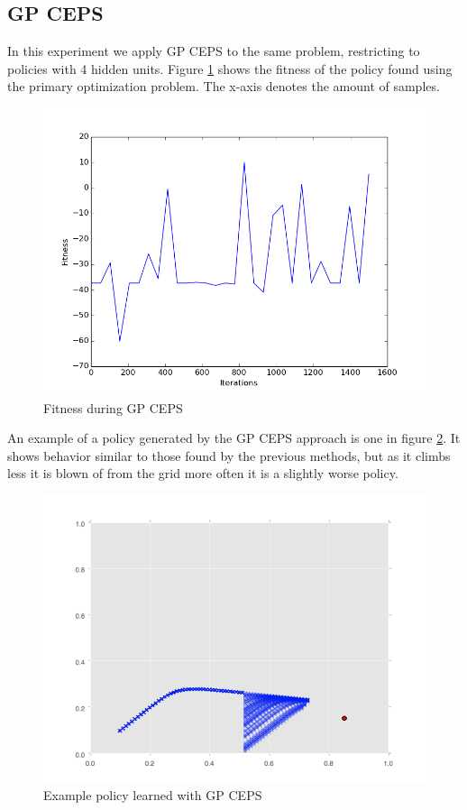 \subsection{GP CEPS}

In this experiment we apply GP CEPS to the same problem, restricting to policies with 4 hidden units. Figure \ref{Fitness during GP CEPS} shows the fitness of the policy found using the primary optimization problem. The x-axis denotes the amount of samples. 

\begin{figure}[ht]
  \centering
  \includegraphics[scale=0.5]{images/GPCEPS_True.png}
  \caption{Fitness during GP CEPS}\label{Fitness during GP CEPS}
\end{figure}

An example of a policy generated by the GP CEPS approach is one in figure \ref{gp_policy}. It shows behavior similar to those found by the previous methods, but as it climbs less it is blown of from the grid more often it is a slightly worse policy. 

\begin{figure}[ht]
  \centering
  \includegraphics[scale=0.5]{images/GPCEPS_policy.png}
  \caption{Example policy learned with GP CEPS}\label{gp_policy}
\end{figure}

